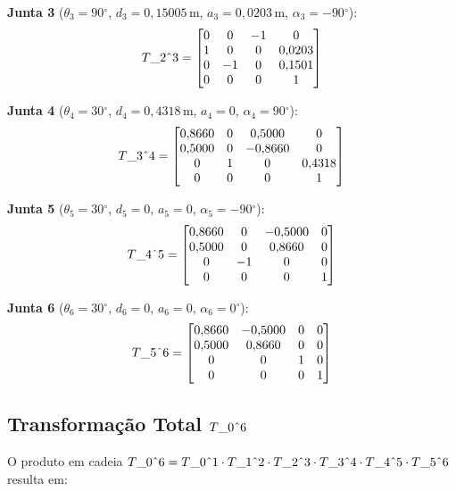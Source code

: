 \documentclass[12pt,a4paper]{article}
\def\Trans#1#2{T\string_#1\string^#2}%
\newcommand{\Trans}[2]{{}^{#1}_{#2}\!\mathbf{T}}
\newcommand{\degr}{\ensuremath{^{\circ}}}
\begin{document}
\textbf{Junta 3} ($\theta_3=90\degr$, $d_3=0{,}15005$\,m, $a_3=0{,}0203$\,m, $\alpha_3=-90\degr$):
\[
  \Trans{2}{3} =
  \begin{bmatrix}
     0 &  0 & -1 &  0        \\
     1 &  0 &  0 &  0{,}0203 \\
     0 & -1 &  0 &  0{,}1501 \\
     0 &  0 &  0 &  1
  \end{bmatrix}
\]

\textbf{Junta 4} ($\theta_4=30\degr$, $d_4=0{,}4318$\,m, $a_4=0$, $\alpha_4=90\degr$):
\[
  \Trans{3}{4} =
  \begin{bmatrix}
     0{,}8660 &  0 &  0{,}5000 & 0 \\
     0{,}5000 &  0 & -0{,}8660 & 0 \\
     0        &  1 &  0        & 0{,}4318 \\
     0        &  0 &  0        & 1
  \end{bmatrix}
\]

\textbf{Junta 5} ($\theta_5=30\degr$, $d_5=0$, $a_5=0$, $\alpha_5=-90\degr$):
\[
  \Trans{4}{5} =
  \begin{bmatrix}
     0{,}8660 &  0 & -0{,}5000 & 0 \\
     0{,}5000 &  0 &  0{,}8660 & 0 \\
     0        & -1 &  0        & 0 \\
     0        &  0 &  0        & 1
  \end{bmatrix}
\]

\textbf{Junta 6} ($\theta_6=30\degr$, $d_6=0$, $a_6=0$, $\alpha_6=0\degr$):
\[
  \Trans{5}{6} =
  \begin{bmatrix}
     0{,}8660 & -0{,}5000 & 0 & 0 \\
     0{,}5000 &  0{,}8660 & 0 & 0 \\
     0        &  0        & 1 & 0 \\
     0        &  0        & 0 & 1
  \end{bmatrix}
\]

\subsection{Transforma\c{c}\~ao Total $\Trans{0}{6}$}

O produto em cadeia
$\Trans{0}{6} = \Trans{0}{1}\cdot\Trans{1}{2}\cdot\Trans{2}{3}\cdot\Trans{3}{4}\cdot\Trans{4}{5}\cdot\Trans{5}{6}$
resulta em:
\end{document}
